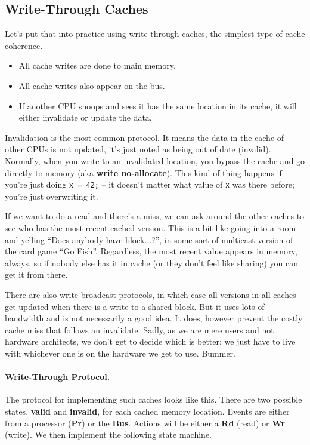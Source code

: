 \subsection*{Write-Through Caches}
Let's put that into practice using write-through caches, the simplest type of
cache coherence.
  \begin{itemize}
    \item All cache writes are done to main memory.
    \item All cache writes also appear on the bus.
    \item If another CPU snoops and sees it has the same location in
      its cache, it will either invalidate or update the
      data.
  \end{itemize}
  
Invalidation is the most common protocol. It means the data in the cache of other CPUs is not updated, it's just noted as being out of date (invalid).  Normally, when you write to an invalidated location, you bypass the cache and go directly to memory (aka {\bf write no-allocate}). This kind of thing happens if you're just doing \texttt{x = 42;} -- it doesn't matter what value of \texttt{x} was there before; you're just overwriting it.

If we want to do a read and there's a miss, we can ask around the other caches to see who has the most recent cached version. This is a bit like going into a room and yelling ``Does anybody have block...?'', in some sort of multicast version of the card game ``Go Fish''. Regardless, the most recent value appears in memory, always, so if nobody else has it in cache (or they don't feel like sharing) you can get it from there.

There are also write broadcast protocols, in which case all versions in all caches get updated when there is a write to a shared block. But it uses lots of bandwidth and is not necessarily a good idea. It does, however prevent the costly cache miss that follows an invalidate. Sadly, as we are mere users and not hardware architects, we don't get to decide which is better; we just have to live with whichever one is on the hardware we get to use. Bummer.

\paragraph{Write-Through Protocol.}
The protocol for implementing such caches looks like this.
There are two possible states, {\bf valid} and {\bf invalid}, for each cached memory location.
Events are either from a processor ({\bf Pr}) or the {\bf Bus}. Actions will be either a \textbf{Rd} (read) or \textbf{Wr} (write).
We then implement the following state machine.


